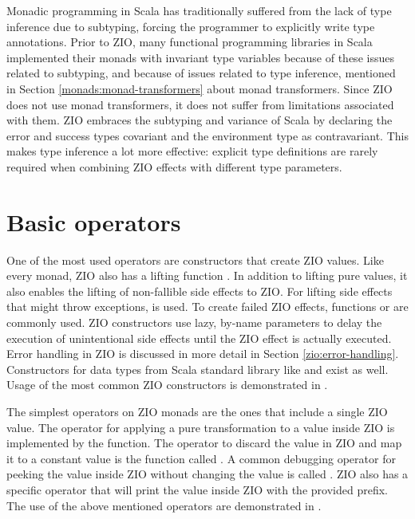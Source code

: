 Monadic programming in Scala has traditionally suffered from the lack of type inference due to subtyping, forcing the programmer to explicitly write type annotations. Prior to ZIO, many functional programming libraries in Scala implemented their monads with invariant type variables because of these issues related to subtyping, and because of issues related to type inference, mentioned in Section \ref{monads:monad-transformers} about monad transformers. Since ZIO does not use monad transformers, it does not suffer from limitations associated with them. ZIO embraces the subtyping and variance of Scala by declaring the error and success types covariant and the environment type as contravariant. This makes type inference a lot more effective: explicit type definitions are rarely required when combining ZIO effects with different type parameters.



\section{Basic operators}
One of the most used operators are constructors that create ZIO values. Like every monad, ZIO also has a lifting function . In addition to lifting pure values, it also enables the lifting of non-fallible side effects to ZIO. For lifting side effects that might throw exceptions,  is used. To create failed ZIO effects, functions  or  are commonly used. ZIO constructors use lazy, by-name parameters to delay the execution of unintentional side effects until the ZIO effect is actually executed.  Error handling in ZIO is discussed in more detail in Section \ref{zio:error-handling}. Constructors for data types from Scala standard library like  and  exist as well. Usage of the most common ZIO constructors is demonstrated in .



The simplest operators on ZIO monads are the ones that include a single ZIO value. The operator for applying a pure transformation to a value inside ZIO is implemented by the  function. The operator to discard the value in ZIO and map it to a constant value is the function called . A common debugging operator for peeking the value inside ZIO without changing the value is called . ZIO also has a specific  operator that will print the value inside ZIO with the provided prefix. The use of the above mentioned operators are demonstrated in .

